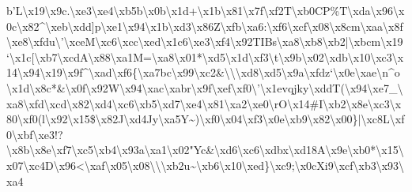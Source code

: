 \documentclass[11pt]{article}
\begin{document}
    b'L\textbackslash{}x19\textbackslash{}x9c.\textbackslash{}xe3\textbackslash{}xe4\textbackslash{}xb5b\textbackslash{}x0b\textbackslash{}x1d+\textbackslash{}x1b\textbackslash{}x81\textbackslash{}x7f\textbackslash{}xf2T\textbackslash{}xb0CP\%T\textbackslash{}xda\textbackslash{}x96\textbackslash{}x0c\textbackslash{}x82\^{}\textbackslash{}xeb\textbackslash{}xdd]p\textbackslash{}xe1\textbackslash{}x94\textbackslash{}x1b\textbackslash{}xd3\textbackslash{}x86Z\textbackslash{}xfb\textbackslash{}xa6:\textbackslash{}xf6\textbackslash{}xcf\textbackslash{}x08\textbackslash{}x8cm\textbackslash{}xaa\textbackslash{}x8f\textbackslash{}xe8\textbackslash{}xfdu\textbackslash{}'\textbackslash{}xceM\textbackslash{}xc6\textbackslash{}xcc\textbackslash{}xed\textbackslash{}x1c6\textbackslash{}xe3\textbackslash{}xf4\textbackslash{}x92TIBs\textbackslash{}xa8\textbackslash{}xb8\textbackslash{}xb2|\textbackslash{}xbcm\textbackslash{}x19`\textbackslash{}x1c[\textbackslash{}xb7\textbackslash{}xcdA\textbackslash{}x88\textbackslash{}xa1M=\textbackslash{}xa8\textbackslash{}x01*\textbackslash{}xd5\textbackslash{}x1d\textbackslash{}xf3\textbackslash{}t\textbackslash{}x9b\textbackslash{}x02\textbackslash{}xdb\textbackslash{}x10\textbackslash{}xc3\textbackslash{}x14\textbackslash{}x94\textbackslash{}x19\textbackslash{}x9f\^{}\textbackslash{}xad\textbackslash{}xf6\{\textbackslash{}xa7bc\textbackslash{}x99\textbackslash{}xc2\&\textbackslash{}\textbackslash{}\textbackslash{}xd8\textbackslash{}xd5\textbackslash{}x9a\textbackslash{}xfdz`\textbackslash{}x0e\textbackslash{}xae\textbackslash{}n\^{}o\textbackslash{}x1d\textbackslash{}x8c*\&\textbackslash{}x0f\textbackslash{}x92W\textbackslash{}x94\textbackslash{}xac\textbackslash{}xabr\textbackslash{}x9f\textbackslash{}xef\textbackslash{}xf0\textbackslash{}'\textbackslash{}x1evqjky\textbackslash{}xddT(\textbackslash{}x94\textbackslash{}xe7\_\textbackslash{}xa8\textbackslash{}xfd\textbackslash{}xcd\textbackslash{}x82\textbackslash{}xd4\textbackslash{}xc6\textbackslash{}xb5\textbackslash{}xd7\textbackslash{}xe4\textbackslash{}x81\textbackslash{}xa2\textbackslash{}xe0\textbackslash{}rO\textbackslash{}x14\#I\textbackslash{}xb2\textbackslash{}x8e\textbackslash{}xc3\textbackslash{}x80\textbackslash{}xf0(l\textbackslash{}x92\textbackslash{}x15\$\textbackslash{}x82J\textbackslash{}xd4Jy\textbackslash{}xa5Y\textasciitilde{})\textbackslash{}xf0\textbackslash{}x04\textbackslash{}xf3\textbackslash{}x0e\textbackslash{}xb9\textbackslash{}x82\textbackslash{}x00\}|\textbackslash{}xc8L\textbackslash{}xf0\textbackslash{}xbf\textbackslash{}xe3!?\textbackslash{}x8b\textbackslash{}x8e\textbackslash{}xf7\textbackslash{}xc5\textbackslash{}xb4\textbackslash{}x93a\textbackslash{}xa1\textbackslash{}x02"Yc\&\textbackslash{}xd6\textbackslash{}xc6\textbackslash{}xdbx\textbackslash{}xd18A\textbackslash{}x9e\textbackslash{}xb0*\textbackslash{}x15\textbackslash{}x07\textbackslash{}xc4D\textbackslash{}x96<\textbackslash{}xaf\textbackslash{}x05\textbackslash{}x08\textbackslash{}\textbackslash{}\textbackslash{}xb2u\textasciitilde{}\textbackslash{}xb6\textbackslash{}x10\textbackslash{}xed\}\textbackslash{}xc9;\textbackslash{}x0cXi9\textbackslash{}xcf\textbackslash{}xb3\textbackslash{}x93\textbackslash{}xa4 
\end{document}
